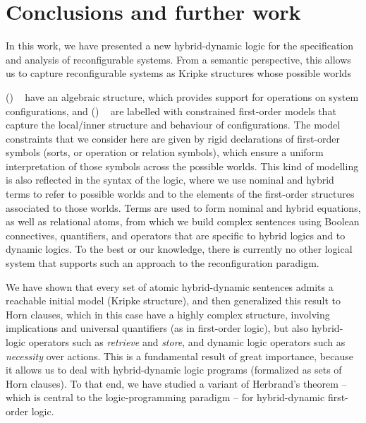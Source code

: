 \documentclass[a4paper,UKenglish,cleveref, autoref]{lipics-v2019}
\newcounter{InParEnum}
\newenvironment{inparenum}{%
  \noindent\ignorespaces%
  \setcounter{InParEnum}{0}%
}{%
  \ignorespacesafterend%
}
\newcommand{\inparitemformat}[1]{%
  \textsf{(\arabic{#1})}%
}
\newcommand{\inparitem}{%
  \stepcounter{InParEnum}%
  \inparitemformat{InParEnum}~%
}
\begin{document}

\section{Conclusions and further work}
\label{section:conclusions}

In this work, we have presented a new hybrid-dynamic logic for the specification and analysis of reconfigurable systems.
From a semantic perspective, this allows us to capture reconfigurable systems as Kripke structures whose possible worlds%
\begin{inparenum}
  \inparitem have an algebraic structure, which provides support for operations on system configurations, and
  \inparitem are labelled with constrained first-order models that capture the local/inner structure and behaviour of configurations.
\end{inparenum}
The model constraints that we consider here are given by rigid declarations of first-order symbols (sorts, or operation or relation symbols), which ensure a uniform interpretation of those symbols across the possible worlds.
This kind of modelling is also reflected in the syntax of the logic, where we use nominal and hybrid terms to refer to possible worlds and to the elements of the first-order structures associated to those worlds.
Terms are used to form nominal and hybrid equations, as well as relational atoms, from which we build complex sentences using Boolean connectives, quantifiers, and operators that are specific to hybrid logics and to dynamic logics.
To the best or our knowledge, there is currently no other logical system that supports such an approach to the reconfiguration paradigm.

We have shown that every set of atomic hybrid-dynamic sentences admits a reachable initial model (Kripke structure), and then generalized this result to Horn clauses, which in this case have a highly complex structure, involving implications and universal quantifiers (as in first-order logic), but also hybrid-logic operators such as \emph{retrieve} and \emph{store}, and dynamic logic operators such as \emph{necessity} over actions.
This is a fundamental result of great importance, because it allows us to deal with hybrid-dynamic logic programs (formalized as sets of Horn clauses).
To that end, we have studied a variant of Herbrand's theorem -- which is central to the logic-programming paradigm -- for hybrid-dynamic first-order logic.
\end{document}
